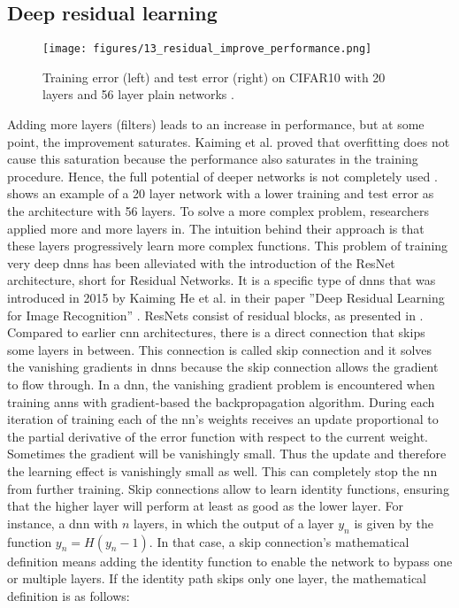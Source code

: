 \subsection{Deep residual learning}
\label{subsec:drl}
\begin{figure}[t]
	\centering
	\texttt{[image: figures/13\_residual\_improve\_performance.png]}
	\caption{Training error (left) and test error (right) on CIFAR10 with 20 layers and 56 layer plain networks \cite{He15}.}
	\label{fig:modelperformance}
\end{figure}
%
\noindent Adding more layers (filters) leads to an increase in performance, but at some point, the improvement saturates. Kaiming et al. proved that overfitting does not cause this saturation because the performance also saturates in the training procedure. Hence, the full potential of deeper networks is not completely used \cite{He15}.  shows an example of a 20 layer network with a lower training and test error as the architecture with 56 layers. To solve a more complex problem, researchers applied more and more layers in. The intuition behind their approach is that these layers progressively learn more complex functions. This problem of training very deep \acp{dnn} has been alleviated with the introduction of the ResNet architecture, short for Residual Networks. It is a specific type of \acp{dnn} that was introduced in 2015 by Kaiming He et al. in their paper ''Deep Residual Learning for Image Recognition'' \cite{He15}. ResNets consist of residual blocks, as presented in . Compared to earlier \ac{cnn} architectures, there is a direct connection that skips some layers in between. This connection is called skip connection and it solves the vanishing gradients in \acp{dnn} because the skip connection allows the gradient to flow through. In a \ac{dnn}, the vanishing gradient problem is encountered when training \acp{ann} with gradient-based the backpropagation algorithm. During each iteration of training each of the \ac{nn}'s weights receives an update proportional to the partial derivative of the error function with respect to the current weight. Sometimes the gradient will be vanishingly small. Thus the update and therefore the learning effect is vanishingly small as well. This can completely stop the \ac{nn} from further training. Skip connections allow to learn identity functions, ensuring that the higher layer will perform at least as good as the lower layer. For instance, a \ac{dnn} with \(n\) layers, in which the output of a layer \(y_n\) is given by the function \(y_n = H(y_n - 1)\). In that case, a skip connection's mathematical definition means adding the identity function to enable the network to bypass one or multiple layers. If the identity path skips only one layer, the mathematical definition is as follows:
